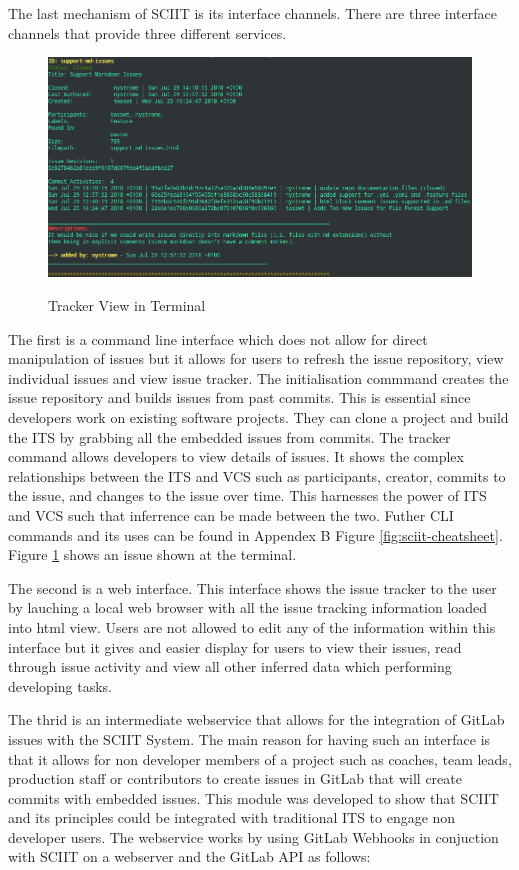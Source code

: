 \documentclass{mproj}
\begin{document}
The last mechanism of SCIIT is its interface channels. There are three interface channels that provide three different services. 

\begin{figure}
\centering
  \caption{Tracker View in Terminal}
  \includegraphics[width=16cm]{sciit-tracker-shot}
  \label{fig:sciit-tracker-shot}
\end{figure}


The first is a command line interface which does not allow for direct manipulation of issues but it allows for users to refresh the issue repository, view individual issues and view issue tracker. The initialisation commmand creates the issue repository and builds issues from past commits. This is essential since developers work on existing software projects. They can clone a project and build the ITS by grabbing all the embedded issues from commits. The tracker command allows developers to view details of issues. It shows the complex relationships between the ITS and VCS such as participants, creator, commits to the issue, and changes to the issue over time. This harnesses the power of ITS and VCS such that inferrence can be made between the two. Futher CLI commands and its uses can be found in Appendex B Figure \ref{fig:sciit-cheatsheet}. Figure \ref{fig:sciit-tracker-shot} shows an issue shown at the terminal.

The second is a web interface. This interface shows the issue tracker to the user by lauching a local web browser with all the issue tracking information loaded into html view. Users are not allowed to edit any of the information within this interface but it gives and easier display for users to view their issues, read through issue activity and view all other inferred data which performing developing tasks.

The thrid is an intermediate webservice that allows for the integration of GitLab issues with the SCIIT System. The main reason for having such an interface is that it allows for non developer members of a project such as coaches, team leads, production staff or contributors to create issues in GitLab that will create commits with embedded issues. This module was developed to show that SCIIT and its principles could be integrated with traditional ITS to engage non developer users. The webservice works by using GitLab Webhooks in conjuction with SCIIT on a webserver and the GitLab API as follows:
\end{document}
